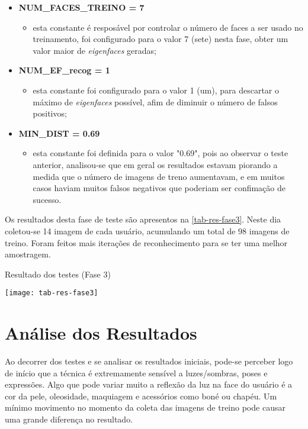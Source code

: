 \begin{itemize}	
	\item \textbf{NUM\_FACES\_TREINO = 7}
	\begin{itemize}	
		\item esta constante é resposável por controlar o número de faces a ser usado no treinamento, foi configurado para o valor 7 (sete) nesta fase, obter um valor maior de \textit{eigenfaces} geradas;
	\end{itemize}
	
	\item \textbf{NUM\_EF\_recog = 1}
	\begin{itemize}	
		\item esta constante foi configurado para o valor 1 (um), para descartar o máximo de \textit{eigenfaces} possível, afim de diminuir o número de falsos positivos;
	\end{itemize}
	
	\item \textbf{MIN\_DIST = 0.69}
	\begin{itemize}	
		\item esta constante foi definida para o valor "0.69", pois ao observar o teste anterior, analisou-se que em geral os resultados estavam piorando a medida que o número de imagens de treno aumentavam, e em muitos casos haviam muitos falsos negativos que poderiam ser confimação de sucesso.
	\end{itemize}
\end{itemize}

Os resultados desta fase de teste são apresentos na \autoref{tab-res-fase3}. Neste dia coletou-se 14 imagem de cada usuário, acumulando um total de 98 imagens de treino. Foram feitos mais iterações de reconhecimento para se ter uma melhor amostragem.

\begin{table}[h]
	\centering
	\caption{Resultado dos testes (Fase 3) }
	\texttt{[image: tab-res-fase3]}
	\label{tab-res-fase3}
\end{table}





\section{Análise dos Resultados}\label{ch:analresult}

Ao decorrer dos testes e se analisar os resultados iniciais, pode-se perceber logo de início que a técnica é extremamente sensível a luzes/sombras, poses e expressões. Algo que pode variar muito a reflexão da luz na face do usuário é a cor da pele, oleosidade, maquiagem e acessórios como boné ou chapéu. Um mínimo movimento no momento da coleta das imagens de treino pode causar uma grande diferença no resultado.

